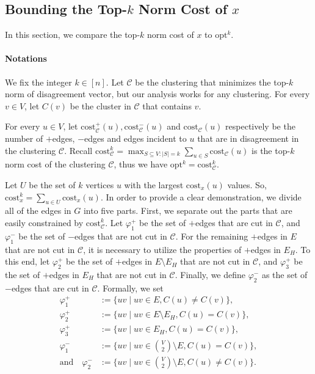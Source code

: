 \documentclass[11pt]{article}
\newcommand{\cost}{\mathrm{cost}}
\newcommand{\calC}{{\mathcal{C}}}
\newcommand{\opt}{{\mathrm{opt}}}
\begin{document}
\begin{CJK*}{UTF8}{gbsn}
\subsection{Bounding the Top-$k$ Norm Cost of $x$}
\label{sec:boundtopknormcost}
In this section, we compare the top-$k$ norm cost of $x$ to $\opt^k$. 

\paragraph{Notations} 
We fix the integer $k \in [n]$. Let $\mathcal{C}$ be the clustering that minimizes the top-$k$ norm of disagreement vector, but our analysis works for any clustering.  For every $v \in V$, let $C(v)$ be the cluster in $\calC$ that contains $v$. 

For every $u \in V$, let $\cost^+_\calC(u), \cost^-_\calC(u)$ and $\cost_\calC(u)$ respectively be the number of $+$edges, $-$edges and edges incident to $u$ that are in disagreement in the clustering $\calC$. Recall $\cost^{k}_\calC = \max_{S \subseteq V:|S| = k} \sum_{u \in S}\cost_\calC(u)$ is the top-$k$ norm cost of the clustering $\calC$, thus we have $\opt^k = \cost^k_\calC$.

Let $U$ be the set of $k$ vertices $u$ with the largest $\cost_x(u)$ values. So, $\cost^k_x = \sum_{u \in U} \cost_x(u)$. In order to provide a clear demonstration, we divide all of the edges in $G$ into five parts. First, we separate out the parts that are easily constrained by $\cost^k_\calC$. Let $\varphi^+_1$ be the set of $+$edges that are cut in $\calC$, and $\varphi^-_1$ be the set of $-$edges that are not cut in $\calC$. For the remaining $+$edges in $E$ that are not cut in $\calC$, it is necessary to utilize the properties of $+$edges in $E_H$. To this end, let $\varphi^+_2$ be the set of $+$edges in $E\setminus E_H$ that are not cut in $\calC$, and $\varphi^+_3$ be the set of $+$edges in $E_H$ that are not cut in $\calC$. Finally, we define $\varphi^-_2$ as the set of $-$edges that are cut in $\calC$. Formally, we set 
\begin{align*}
    \varphi^+_1 &:= \{uv \mid uv \in E, C(u) \not= C(v) \},\\
    \varphi^+_2 &:= \{uv \mid uv \in E \setminus E_H, C(u) = C(v) \},   \\
    \varphi^+_3 &:= \{uv \mid uv \in E_H, C(u) = C(v) \}, \\
    \varphi^-_1 &:= \{uv \mid uv \in {V \choose 2} \setminus E, C(u) = C(v)\},\\
    \text{and} \quad \varphi^-_2 &:= \{uv \mid uv \in {V \choose 2} \setminus E, C(u) \not= C(v)\}.
\end{align*} 


\end{CJK*}
\end{document}
